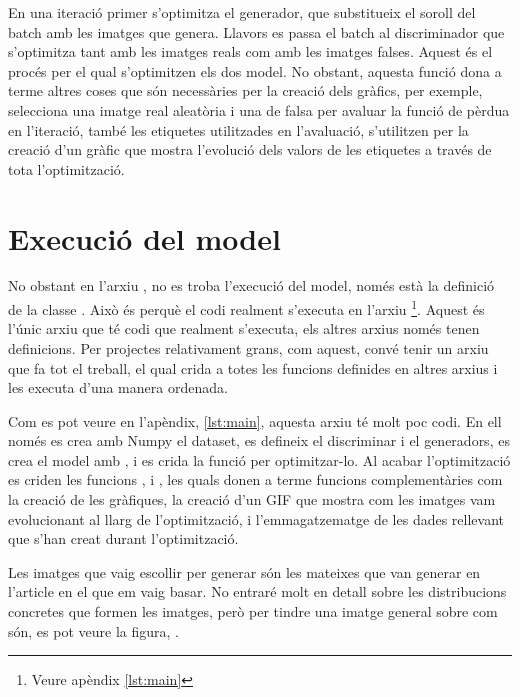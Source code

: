 En una iteració primer s'optimitza el generador, que substitueix el soroll del batch amb les imatges que genera. Llavors es passa el batch al discriminador que s'optimitza tant amb les imatges reals com amb les imatges falses. Aquest és el procés per el qual s'optimitzen els dos model. No obstant, aquesta funció dona a terme altres coses que són necessàries per la creació dels gràfics, per exemple, selecciona una imatge real aleatòria i una de falsa per avaluar la funció de pèrdua en l'iteració, també les etiquetes utilitzades en l'avaluació, s'utilitzen per la creació d'un gràfic que mostra l'evolució dels valors de les etiquetes a través de tota l'optimització. 

\section{Execució del model}

No obstant en l'arxiu , no es troba l'execució del model, només està la definició de la classe . Això és perquè el codi realment s'executa en l'arxiu \footnote{Veure apèndix \ref{lst:main}}. Aquest és l'únic arxiu que té codi que realment s'executa, els altres arxius només tenen definicions. Per projectes relativament grans, com aquest, convé tenir un arxiu que fa tot el treball, el qual crida a totes les funcions definides en altres arxius i les executa d'una manera ordenada. 

Com es pot veure en l'apèndix, \ref{lst:main}, aquesta arxiu té molt poc codi. En ell només es crea amb Numpy el dataset, es defineix el discriminar i el generadors, es crea el model amb , i es crida la funció  per optimitzar-lo. Al acabar l'optimització es criden les funcions ,  i , les quals donen a terme funcions complementàries com la creació de les gràfiques, la creació d'un GIF que mostra com les imatges vam evolucionant al llarg de l'optimització, i l'emmagatzematge de les dades rellevant que s'han creat durant l'optimització.  

Les imatges que vaig escollir per generar són les mateixes que van generar en l'article en el que em vaig basar. No entraré molt en detall sobre les distribucions concretes que formen les imatges, però per tindre una imatge general sobre com són, es pot veure la figura, .

